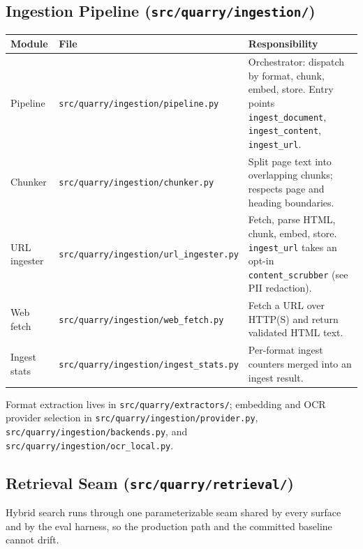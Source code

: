 \documentclass[a4paper,10pt]{article}
\newcommand{\modpath}[1]{\texttt{src/quarry/#1}}
\begin{document}
\subsection{Ingestion Pipeline (\modpath{ingestion/})}

\begin{center}
\begin{tabular}{llp{7cm}}
\toprule
\textbf{Module} & \textbf{File} & \textbf{Responsibility} \\
\midrule
Pipeline    & \modpath{ingestion/pipeline.py}    & Orchestrator:
              dispatch by format, chunk, embed, store.  Entry points
              \texttt{ingest\_document}, \texttt{ingest\_content},
              \texttt{ingest\_url}. \\
Chunker     & \modpath{ingestion/chunker.py}     & Split page text into
              overlapping chunks; respects page and heading boundaries. \\
URL ingester & \modpath{ingestion/url\_ingester.py} & Fetch, parse HTML,
              chunk, embed, store.  \texttt{ingest\_url} takes an opt-in
              \texttt{content\_scrubber} (see PII redaction). \\
Web fetch   & \modpath{ingestion/web\_fetch.py}  & Fetch a URL over
              HTTP(S) and return validated HTML text. \\
Ingest stats & \modpath{ingestion/ingest\_stats.py} & Per-format ingest
              counters merged into an ingest result. \\
\bottomrule
\end{tabular}
\end{center}

Format extraction lives in \modpath{extractors/}; embedding and OCR
provider selection in \modpath{ingestion/provider.py},
\modpath{ingestion/backends.py}, and \modpath{ingestion/ocr\_local.py}.

\subsection{Retrieval Seam (\modpath{retrieval/})}

Hybrid search runs through one parameterizable seam shared by every
surface and by the eval harness, so the production path and the
committed baseline cannot drift.
\end{document}
